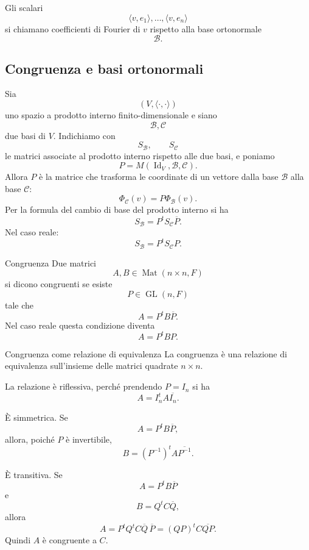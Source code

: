 \documentclass[a4paper]{article}
\begin{document}
Gli scalari
\[
    \langle v,e_1\rangle,\ldots,\langle v,e_n\rangle
\]
si chiamano coefficienti di Fourier di \(v\) rispetto alla base ortonormale
\[
    \mathcal{B}.
\]

\subsection{Congruenza e basi ortonormali}

Sia
\[
    (V,\langle\cdot,\cdot\rangle)
\]
uno spazio a prodotto interno finito-dimensionale e siano
\[
    \mathcal{B},\mathcal{C}
\]
due basi di \(V\). Indichiamo con
\[
    S_{\mathcal{B}},
    \qquad
    S_{\mathcal{C}}
\]
le matrici associate al prodotto interno rispetto alle due basi, e poniamo
\[
    P=M(\operatorname{Id}_V,\mathcal{B},\mathcal{C}).
\]
Allora \(P\) è la matrice che trasforma le coordinate di un vettore dalla base \(\mathcal{B}\) alla base \(\mathcal{C}\):
\[
    \Phi_{\mathcal{C}}(v)=P\Phi_{\mathcal{B}}(v).
\]
Per la formula del cambio di base del prodotto interno si ha
\[
    S_{\mathcal{B}}=P^tS_{\mathcal{C}}\overline{P}.
\]
Nel caso reale:
\[
    S_{\mathcal{B}}=P^tS_{\mathcal{C}}P.
\]

\begin{snippetdefinition}{Congruenza}
    Due matrici
    \[
        A,B\in\operatorname{Mat}(n\times n,F)
    \]
    si dicono congruenti se esiste
    \[
        P\in\operatorname{GL}(n,F)
    \]
    tale che
    \[
        A=P^tB\overline{P}.
    \]
    Nel caso reale questa condizione diventa
    \[
        A=P^tBP.
    \]
\end{snippetdefinition}

\begin{snippetproposition}{Congruenza come relazione di equivalenza}
    La congruenza è una relazione di equivalenza sull'insieme delle matrici quadrate \(n\times n\).
\end{snippetproposition}

\begin{snippetproof}{}
    La relazione è riflessiva, perché prendendo \(P=I_n\) si ha
    \[
        A=I_n^tA\overline{I_n}.
    \]

    È simmetrica. Se
    \[
        A=P^tB\overline{P},
    \]
    allora, poiché \(P\) è invertibile,
    \[
        B=(P^{-1})^tA\overline{P^{-1}}.
    \]

    È transitiva. Se
    \[
        A=P^tB\overline{P}
    \]
    e
    \[
        B=Q^tC\overline{Q},
    \]
    allora
    \[
        A
        =
        P^tQ^tC\overline{Q}\,\overline{P}
        =
        (QP)^tC\overline{QP}.
    \]
    Quindi \(A\) è congruente a \(C\).
\end{snippetproof}
\end{document}
